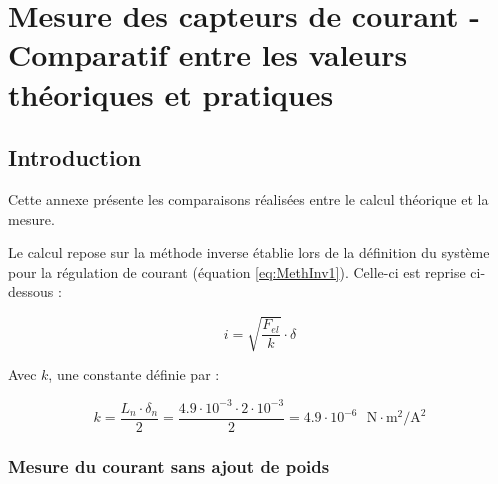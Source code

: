 \chapter{Mesure des capteurs de courant - Comparatif entre les valeurs théoriques et pratiques}
\label{annexe:MesCour}

\section{Introduction}
Cette annexe présente les comparaisons réalisées entre le calcul théorique et la mesure.

Le calcul repose sur la méthode inverse établie lors de la définition du système pour la régulation de courant (équation \ref{eq:MethInv1}). Celle-ci est reprise ci-dessous :

\begin{equation}
    i = \sqrt{\frac{F_{el}}{k}} \cdot \delta
\end{equation}

Avec $k$, une constante définie par :

\begin{equation}
    k = \frac{L_n\cdot\delta_n}{2} = \frac{4.9\cdot 10^{-3}\cdot 2\cdot 10^{-3}}{2}=4.9\cdot 10^{-6} \text{ } \text{N}\cdot\text{m}^2/\text{A}^2
\end{equation}

\subsection{Mesure du courant sans ajout de poids}

